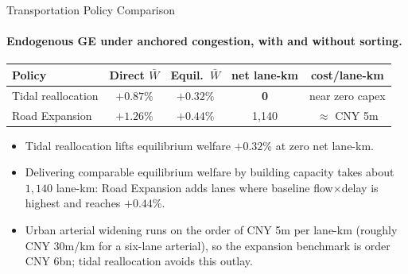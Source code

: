 \documentclass[11pt,aspectratio=169]{beamer}
\newcommand{\good}[1]{\textcolor{blue!70!black}{#1}}
\newcommand{\app}[1]{\allowbreak\hspace{0.25em}\hyperlink{#1}{\beamergotobutton{details}}}
\begin{document}
\begin{frame}[label=result4]{Transportation Policy Comparison}
\framesubtitle{Endogenous GE under anchored congestion, with and without sorting.}
\begin{center}\scriptsize
\begin{tabular}{lcccc}
\toprule
Policy & Direct $\bar W$ & Equil.\ $\bar W$ & net lane-km & cost/lane-km \\
\midrule
Tidal reallocation & $+0.87\%$ & $+0.32\%$ & \good{\textbf{0}} & near zero capex \\
Road Expansion & $+1.26\%$ & $+0.44\%$ & 1{,}140 & $\approx$ CNY 5m \\
\bottomrule
\end{tabular}
\end{center}
\vspace{0.3em}
\begin{itemize}\footnotesize
  \item Tidal reallocation lifts equilibrium welfare $+0.32\%$ at zero net lane-km.
  \item Delivering comparable equilibrium welfare by building capacity takes about $1{,}140$ lane-km: Road Expansion adds lanes where baseline flow$\times$delay is highest and reaches $+0.44\%$.
  \item Urban arterial widening runs on the order of CNY 5m per lane-km (roughly CNY 30m/km for a six-lane arterial), so the expansion benchmark is order CNY 6bn; tidal reallocation avoids this outlay. \app{apppolicy}
\end{itemize}
\end{frame}
\end{document}
